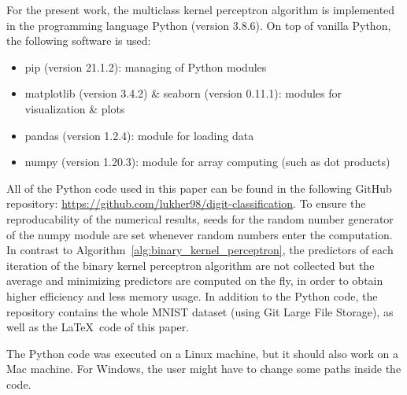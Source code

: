 For the present work, the multiclass kernel perceptron algorithm is implemented in the programming language Python (version 3.8.6).
On top of vanilla Python, the following software is used:
\begin{itemize}
	\item pip (version 21.1.2): managing of Python modules 
	\item matplotlib (version 3.4.2) \& seaborn (version 0.11.1): modules for visualization \& plots
	\item pandas (version 1.2.4): module for loading data
	\item numpy (version 1.20.3): module for array computing (such as dot products)
\end{itemize}
All of the Python code used in this paper can be found in the following GitHub repository: \url{https://github.com/lukher98/digit-classification}. To ensure the reproducability of the numerical results, seeds for the random number generator of the numpy module are set whenever random numbers enter the computation. In contrast to Algorithm~\ref{alg:binary_kernel_perceptron}, the predictors of each iteration of the binary kernel perceptron algorithm are not collected but the average and minimizing predictors are computed on the fly, in order to obtain higher efficiency and less memory usage.
In addition to the Python code, the repository contains the whole MNIST dataset (using Git Large File Storage), as well as the \LaTeX\ code of this paper.

The Python code was executed on a Linux machine, but it should also work on a Mac machine. For Windows, the user might have to change some paths inside the code.